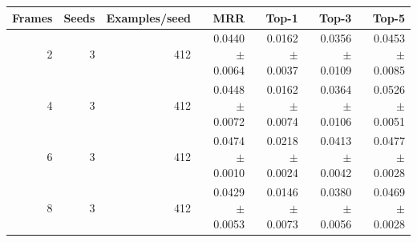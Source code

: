 \begin{tabular}{rrrrrrr}
Frames & Seeds & Examples/seed & MRR & Top-1 & Top-3 & Top-5 \\
\hline
2 & 3 & 412 & 0.0440 $\pm$ 0.0064 & 0.0162 $\pm$ 0.0037 & 0.0356 $\pm$ 0.0109 & 0.0453 $\pm$ 0.0085 \\
4 & 3 & 412 & 0.0448 $\pm$ 0.0072 & 0.0162 $\pm$ 0.0074 & 0.0364 $\pm$ 0.0106 & 0.0526 $\pm$ 0.0051 \\
6 & 3 & 412 & 0.0474 $\pm$ 0.0010 & 0.0218 $\pm$ 0.0024 & 0.0413 $\pm$ 0.0042 & 0.0477 $\pm$ 0.0028 \\
8 & 3 & 412 & 0.0429 $\pm$ 0.0053 & 0.0146 $\pm$ 0.0073 & 0.0380 $\pm$ 0.0056 & 0.0469 $\pm$ 0.0028 \\
\end{tabular}
